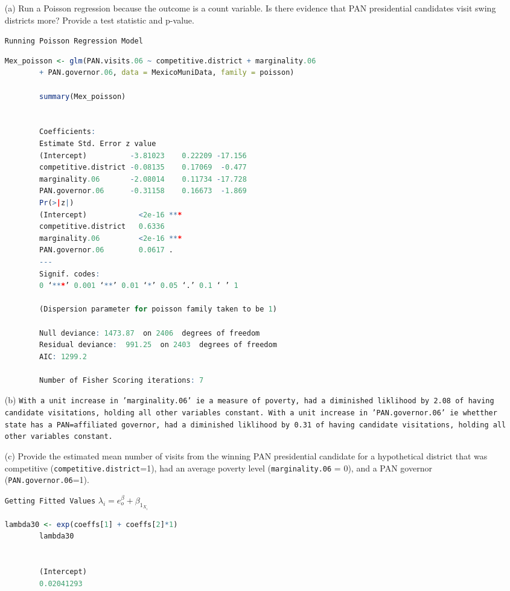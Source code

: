 \documentclass[12pt,letterpaper]{article}
\begin{document}
\begin{enumerate}
	\item [(a)]
	Run a Poisson regression because the outcome is a count variable. Is there evidence that PAN presidential candidates visit swing districts more? Provide a test statistic and p-value.
	
	\newline\texttt{Running Poisson Regression Model}
	\begin{lstlisting}[language=R]
		Mex_poisson <- glm(PAN.visits.06 ~ competitive.district + marginality.06
		+ PAN.governor.06, data = MexicoMuniData, family = poisson)
		
		summary(Mex_poisson)
		
		
		Coefficients:
		Estimate Std. Error z value
		(Intercept)          -3.81023    0.22209 -17.156
		competitive.district -0.08135    0.17069  -0.477
		marginality.06       -2.08014    0.11734 -17.728
		PAN.governor.06      -0.31158    0.16673  -1.869
		Pr(>|z|)    
		(Intercept)            <2e-16 ***
		competitive.district   0.6336    
		marginality.06         <2e-16 ***
		PAN.governor.06        0.0617 .  
		---
		Signif. codes:  
		0 ‘***’ 0.001 ‘**’ 0.01 ‘*’ 0.05 ‘.’ 0.1 ‘ ’ 1
		
		(Dispersion parameter for poisson family taken to be 1)
		
		Null deviance: 1473.87  on 2406  degrees of freedom
		Residual deviance:  991.25  on 2403  degrees of freedom
		AIC: 1299.2
		
		Number of Fisher Scoring iterations: 7
	\end{lstlisting}

	\item [(b)]
	\texttt{With a unit increase in 'marginality.06' ie a measure of poverty, had a diminished liklihood by 2.08 of having candidate visitations, holding all other variables constant. 
		With a unit increase in 'PAN.governor.06' ie whetther state has a PAN=affiliated governor, had a diminished liklihood by 0.31 of having candidate visitations, holding all other variables constant.}
	\item [(c)]
	Provide the estimated mean number of visits from the winning PAN presidential candidate for a hypothetical district that was competitive (\texttt{competitive.district}=1), had an average poverty level (\texttt{marginality.06} = 0), and a PAN governor (\texttt{PAN.governor.06}=1).
	
	
	\vspace{2cm}
	
	
	\texttt{Getting Fitted Values}
	\newline\texttt{$ \lambda_i = e^\beta_o + \beta_1_X_i$}
	
	\begin{lstlisting}[language=R]
		lambda30 <- exp(coeffs[1] + coeffs[2]*1)
		lambda30
		
		
		(Intercept) 
		0.02041293
	\end{lstlisting}
\end{enumerate}
\end{document}
